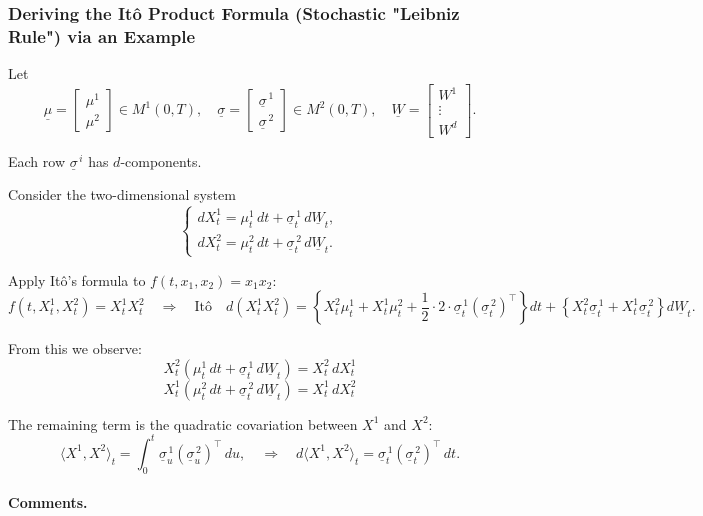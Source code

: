 \documentclass[12pt,a4paper]{article}
\theoremstyle{definition}
\begin{document}
\subsubsection{Deriving the Itô Product Formula (Stochastic "Leibniz Rule") via an Example}

Let
\[
\underline{\mu} = \begin{bmatrix} \mu^1 \\ \mu^2 \end{bmatrix} \in M^1(0,T), \quad \underline{\sigma} = \begin{bmatrix} \underline{\sigma}^{\,1} \\ \underline{\sigma}^{\,2} \end{bmatrix} \in M^2(0,T), \quad \underline{W} = \begin{bmatrix} W^1 \\ \vdots \\ W^d \end{bmatrix}.
\]

Each row $\underline{\sigma}^{\,i}$ has $d$-components.

Consider the two-dimensional system
\[
\begin{cases}
dX_t^1 = \mu_t^1 \, dt + \underline{\sigma}_t^{\,1} \, d\underline{W}_t, \\
dX_t^2 = \mu_t^2 \, dt + \underline{\sigma}_t^{\,2} \, d\underline{W}_t.
\end{cases}
\]

Apply Itô's formula to $f(t, x_1, x_2) = x_1 x_2$:
\[
f(t, X_t^1, X_t^2) = X_t^1 X_t^2 \quad \Rightarrow \quad \text{Itô} \quad d(X_t^1 X_t^2) = \left\{X_t^2 \mu_t^1 + X_t^1 \mu_t^2 + \frac{1}{2} \cdot 2 \cdot \underline{\sigma}_t^{\,1} (\underline{\sigma}_t^{\,2})^\top\right\} dt + \left\{X_t^2 \underline{\sigma}_t^{\,1} + X_t^1 \underline{\sigma}_t^{\,2}\right\} d\underline{W}_t.
\]

From this we observe:
\[
X_t^2 (\mu_t^1 \, dt + \underline{\sigma}_t^{\,1} \, d\underline{W}_t) = X_t^2 \, dX_t^1
\]
\[
X_t^1 (\mu_t^2 \, dt + \underline{\sigma}_t^{\,2} \, d\underline{W}_t) = X_t^1 \, dX_t^2
\]

The remaining term is the quadratic covariation between $X^1$ and $X^2$:
\[
\langle X^1, X^2 \rangle_t = \int_0^t \underline{\sigma}_u^{\,1} (\underline{\sigma}_u^{\,2})^\top \, du, \quad \Rightarrow \quad d\langle X^1, X^2 \rangle_t = \underline{\sigma}_t^{\,1} (\underline{\sigma}_t^{\,2})^\top \, dt.
\]

\paragraph{Comments.}
\end{document}
